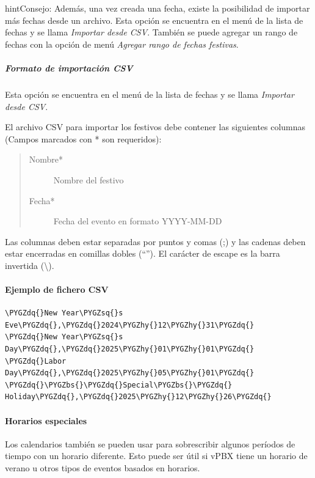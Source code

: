 \documentclass[letterpaper,10pt,spanish]{sphinxmanual}
\def\PYGZbs{\char`\\}
\def\PYGZhy{\char`\-}
\def\PYGZsq{\char`\'}
\def\PYGZdq{\char`\"}
\renewcommand\PYGZsq{\textquotesingle}
\begin{document}
\begin{notice}{hint}{Consejo:}
Además, una vez creada una fecha, existe la posibilidad de importar más fechas desde un archivo. Esta opción se encuentra en el menú de la lista de fechas y se llama \emph{Importar desde CSV}. También se puede agregar un rango de fechas con la opción de menú \emph{Agregar rango de fechas festivas}.
\end{notice}


\subparagraph{Formato de importación CSV}
\label{administration_portal/client/vpbx/routing_tools/calendars:csv-import-format}
Esta opción se encuentra en el menú de la lista de fechas y se llama \emph{Importar desde CSV}.

El archivo CSV para importar los festivos debe contener las siguientes columnas (Campos marcados con * son requeridos):
\begin{quote}
\begin{description}
\item[{Nombre*}] \leavevmode
Nombre del festivo

\item[{Fecha*}] \leavevmode
Fecha del evento en formato YYYY-MM-DD

\end{description}
\end{quote}

Las columnas deben estar separadas por puntos y comas (;) y las cadenas deben estar encerradas en comillas dobles (``''). El carácter de escape es la barra invertida (\textbackslash{}).
\paragraph{Ejemplo de fichero CSV}

\begin{Verbatim}[commandchars=\\\{\}]
\PYGZdq{}New Year\PYGZsq{}s Eve\PYGZdq{},\PYGZdq{}2024\PYGZhy{}12\PYGZhy{}31\PYGZdq{}
\PYGZdq{}New Year\PYGZsq{}s Day\PYGZdq{},\PYGZdq{}2025\PYGZhy{}01\PYGZhy{}01\PYGZdq{}
\PYGZdq{}Labor Day\PYGZdq{},\PYGZdq{}2025\PYGZhy{}05\PYGZhy{}01\PYGZdq{}
\PYGZdq{}\PYGZbs{}\PYGZdq{}Special\PYGZbs{}\PYGZdq{} Holiday\PYGZdq{},\PYGZdq{}2025\PYGZhy{}12\PYGZhy{}26\PYGZdq{}
\end{Verbatim}


\paragraph{Horarios especiales}
\label{administration_portal/client/vpbx/routing_tools/calendars:id2}\label{administration_portal/client/vpbx/routing_tools/calendars:special-schedules}
Los calendarios también se pueden usar para sobrescribir algunos períodos de tiempo con un horario diferente. Esto puede ser útil si vPBX tiene un horario de verano u otros tipos de eventos basados en horarios.
\end{document}
